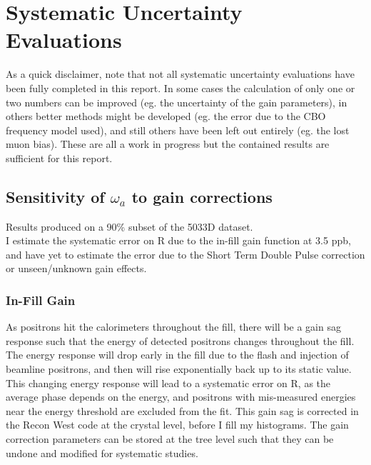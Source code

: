 \graphicspath{ {Figures/Pileup/Multiplier/} {Figures/Pileup/Phase/} {Figures/Pileup/EnergyScaling/} {Figures/RandomSeeds/FitStartScans/} {Figures/RandomSeeds/FitIterations/} {Figures/Miscellaneous/} {Figures/FitStartScans/} {Figures/CBO/Frequency/} {Figures/CBO/Shape/} {Figures/CBO/LifetimeScan/} {Figures/Gain/InFill/} {Figures/Gain/InFillCrystals/} {Figures/VW/} {Figures/LostMuons/} {Figures/BunchNumber/} }

\chapter{Systematic Uncertainty Evaluations}
\label{Ch:Systematics}

	As a quick disclaimer, note that not all systematic uncertainty evaluations have been fully completed in this report. In some cases the calculation of only one or two numbers can be improved (eg. the uncertainty of the gain parameters), in others better methods might be developed (eg. the error due to the CBO frequency model used), and still others have been left out entirely (eg. the lost muon bias). These are all a work in progress but the contained results are sufficient for this report.
	

\section{Sensitivity of \texorpdfstring{$\omega_{a}$}{} to gain corrections}
\label{Sec:SystematicGain}

	Results produced on a 90\% subset of the 5033D dataset. \\

	I estimate the systematic error on R due to the in-fill gain function at 3.5 ppb, and have yet to estimate the error due to the Short Term Double Pulse correction or unseen/unknown gain effects. %

	\subsection{In-Fill Gain}

		As positrons hit the calorimeters throughout the fill, there will be a gain sag response such that the energy of detected positrons changes throughout the fill. The energy response will drop early in the fill due to the flash and injection of beamline positrons, and then will rise exponentially back up to its static value. This changing energy response will lead to a systematic error on R, as the average \gmtwo phase depends on the energy, and positrons with mis-measured energies near the energy threshold are excluded from the fit. This gain sag is corrected in the Recon West code at the crystal level, before I fill my histograms. The gain correction parameters can be stored at the tree level such that they can be undone and modified for systematic studies.

